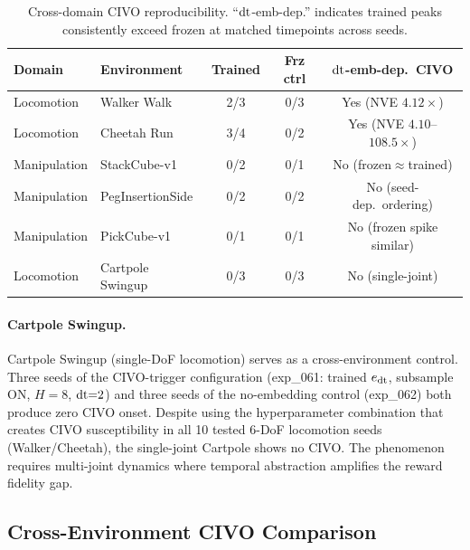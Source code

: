 \begin{table}[h]
\centering
\caption{Cross-domain CIVO reproducibility. ``$\mathrm{dt}$-emb-dep.'' indicates trained peaks consistently exceed frozen at matched timepoints across seeds.}
\label{tab:cross_domain}
\footnotesize
\begin{tabular}{llccc}
\toprule
\textbf{Domain} & \textbf{Environment} & \textbf{Trained} & \textbf{Frz ctrl} & \textbf{$\mathrm{dt}$-emb-dep.\ CIVO} \\
\midrule
Locomotion & Walker Walk & 2/3 & 0/3 & Yes (NVE $4.12\times$) \\
Locomotion & Cheetah Run & 3/4 & 0/2 & Yes (NVE $4.10$--$108.5\times$) \\
Manipulation & StackCube-v1 & 0/2 & 0/1 & No (frozen$\approx$trained) \\
Manipulation & PegInsertionSide & 0/2 & 0/2 & No (seed-dep.\ ordering) \\
Manipulation & PickCube-v1 & 0/1 & 0/1 & No (frozen spike similar) \\
\midrule
Locomotion & Cartpole Swingup & 0/3 & 0/3 & No (single-joint) \\
\bottomrule
\end{tabular}
\end{table}

\paragraph{Cartpole Swingup.} Cartpole Swingup (single-DoF locomotion) serves as a cross-environment control. Three seeds of the CIVO-trigger configuration (exp\_061: trained $e_{\mathrm{dt}}$, subsample ON, $H{=}8$, $\mathrm{dt}{=}2$) and three seeds of the no-embedding control (exp\_062) both produce zero CIVO onset. Despite using the hyperparameter combination that creates CIVO susceptibility in all 10 tested 6-DoF locomotion seeds (Walker/Cheetah), the single-joint Cartpole shows no CIVO. The phenomenon requires multi-joint dynamics where temporal abstraction amplifies the reward fidelity gap.

\subsection{Cross-Environment CIVO Comparison}
\label{sec:cross_env_appendix}

